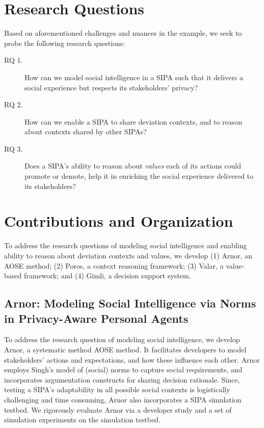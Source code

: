 \documentclass[11pt,          %
               phd,           %
               onehalfspacing %
               ]{ncsuthesis}
\newcommand{\fsl}{\textsl}
\newcommand{\frameworkA}{Arnor\xspace}
\newcommand{\frameworkB}{Poros\xspace}
\newcommand{\frameworkC}{Valar\xspace}
\newcommand{\frameworkD}{Gimli\xspace}
\begin{document}
\section{Research Questions}
\label{sec:intro-questions}

Based on aforementioned challenges and nuances in the example, we seek 
to probe the following research questions: 

\begin{description}

\item[RQ 1.] How can we model social intelligence in a SIPA such that it
delivers a social experience but respects its stakeholders' privacy?

\item[RQ 2.] How can we enable a SIPA to share deviation contexts, and to
reason about contexts shared by other SIPAs? 

\item[RQ 3.] Does a SIPA's ability to reason about \fsl{values} each of
its actions could promote or demote, help it in enriching the social
experience delivered to its stakeholders?

\end{description}

\section{Contributions and Organization}
\label{sec:intro-contributions}

To address the research questions of modeling social intelligence and
enabling ability to reason about deviation contexts and values, we
develop (1) \frameworkA, an AOSE method; (2) \frameworkB, a context
reasoning framework; (3) \frameworkC, a value-based framework; and (4)
\frameworkD, a decision support system.

\subsection[Modeling Soical Intelligence via Norms]{\frameworkA: Modeling Social Intelligence via Norms in 
Privacy-Aware Personal Agents}

To address the research question of modeling social intelligence, we
develop \frameworkA \citep{Ajmeri-AAMAS17-Arnor}, a systematic method
AOSE method. It facilitates developers to model stakeholders' actions
and expectations, and how these influence each other. \frameworkA
employs Singh's \citep{Singh-2013-Norms} model of (social) norms to
capture social requirements, and incorporates argumentation constructs
\citep{BenchCapon-2007-Argumentation+AI} for sharing decision rationale.
Since, testing a SIPA's adaptability in all possible social contexts is
logistically challenging and time consuming, \frameworkA also
incorporates a SIPA simulation testbed. We rigorously evaluate
\frameworkA via a developer study and a set of simulation experiments on
the simulation testbed. 
\end{document}
